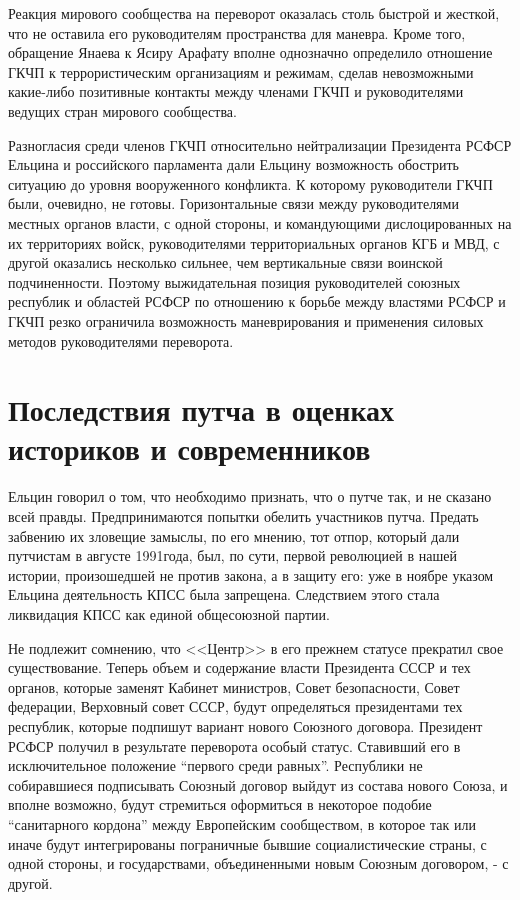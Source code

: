 \documentclass[12pt]{extarticle}
\begin{document}
Реакция мирового сообщества на переворот оказалась столь быстрой и жесткой, что не оставила его руководителям пространства для маневра. Кроме того, обращение Янаева к Ясиру Арафату вполне однозначно определило отношение ГКЧП к террористическим организациям и режимам, сделав невозможными какие-либо позитивные контакты между членами ГКЧП и руководителями ведущих стран мирового сообщества.

Разногласия среди членов ГКЧП относительно нейтрализации Президента РСФСР Ельцина и российского парламента дали Ельцину возможность обострить ситуацию до уровня вооруженного конфликта. К которому руководители ГКЧП были, очевидно, не готовы. Горизонтальные связи между руководителями местных органов власти, с одной стороны, и командующими дислоцированных на их территориях войск, руководителями территориальных органов КГБ и МВД, с другой оказались несколько сильнее, чем вертикальные связи воинской подчиненности. Поэтому выжидательная позиция руководителей союзных республик и областей РСФСР по отношению к борьбе между властями РСФСР и ГКЧП резко ограничила возможность маневрирования и применения силовых методов руководителями переворота.

\section{Последствия путча в оценках историков и современников}
Ельцин говорил о том, что необходимо признать, что о путче так, и не сказано всей правды. Предпринимаются попытки обелить участников путча. Предать забвению их зловещие замыслы, по его мнению, тот отпор, который дали путчистам в августе 1991года, был, по сути, первой революцией в нашей истории, произошедшей не против закона, а в защиту его: уже в ноябре указом Ельцина деятельность КПСС была запрещена. Следствием этого стала ликвидация КПСС как единой общесоюзной партии.

Не подлежит сомнению, что <<Центр>> в его прежнем статусе прекратил свое существование. Теперь объем и содержание власти Президента СССР и тех органов, которые заменят Кабинет министров, Совет безопасности, Совет федерации, Верховный совет СССР, будут определяться президентами тех республик, которые подпишут вариант нового Союзного договора. Президент РСФСР получил в результате переворота особый статус. Ставивший его в исключительное положение “первого среди равных”. Республики не собиравшиеся подписывать Союзный договор выйдут из состава нового Союза, и вполне возможно, будут стремиться оформиться в некоторое подобие “санитарного кордона” между Европейским сообществом, в которое так или иначе будут интегрированы пограничные бывшие социалистические страны, с одной стороны, и государствами, объединенными новым Союзным договором, - с другой.
\end{document}
